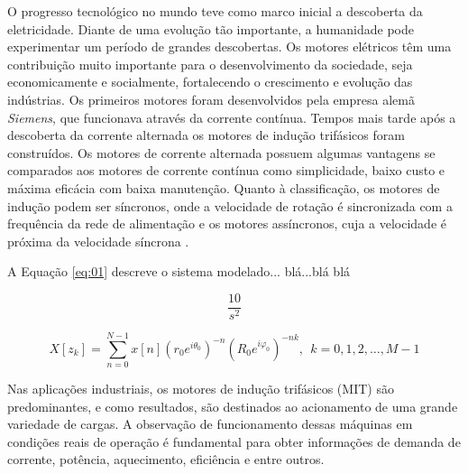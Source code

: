 O progresso tecnológico no mundo teve como marco inicial a descoberta da eletricidade. Diante de uma evolução tão importante, a humanidade pode experimentar um período de grandes descobertas. 
Os motores elétricos têm uma contribuição muito importante para o desenvolvimento da sociedade, seja economicamente e socialmente, fortalecendo o crescimento e evolução das indústrias.
Os primeiros motores foram desenvolvidos pela empresa alemã \textit{Siemens}, que funcionava através da corrente contínua. Tempos mais tarde após a descoberta da corrente alternada os motores de indução trifásicos foram construídos. Os motores de corrente alternada possuem algumas vantagens se comparados aos motores de corrente contínua como simplicidade, baixo custo e máxima eficácia com baixa manutenção. Quanto à classificação, os motores de indução podem ser síncronos, onde a velocidade de rotação é sincronizada com a frequência da rede de alimentação e os motores assíncronos, cuja a velocidade é próxima da velocidade síncrona \cite{Kosow1993}. 

A Equação \eqref{eq:01} descreve o sistema modelado... blá...blá blá 

\begin{equation}
	\label{eq:01}
	\dfrac{10}{s^{2}} 
\end{equation}

\begin{equation}
	{X}[{{z}}_k]=\sum^{N-1}_{{n=0}}{{x}[{n}]{(r_0e^{i{\theta }_0})}^{-n}{(R_0e^{i{\varphi }_0})}^{-nk}}, ~~ k=0,1,2,\dots ,M-1 \textrm{}
\end{equation}

Nas aplicações industriais, os motores de indução trifásicos (MIT) são predominantes, e como resultados, são destinados ao acionamento de uma grande variedade de cargas. A observação de funcionamento dessas máquinas em condições reais de operação é fundamental para obter informações de demanda de corrente, potência, aquecimento, eficiência e entre outros.

